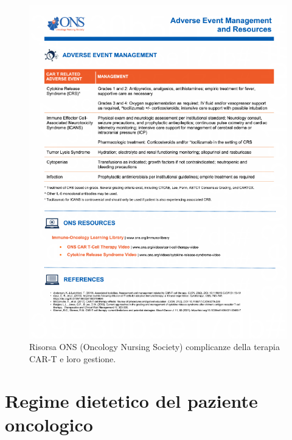 \begin{figure}[H]
    \begin{center}
    \vspace{-3mm}
    \includegraphics[width=0.9\columnwidth]{img/ONS.png}
    \end{center}
    \caption{Risorsa ONS (Oncology Nursing Society) complicanze della terapia CAR-T e loro gestione.
    \cite{ONSCART}}
    \label{fig:FIGURE_5.7}
\end{figure}

\section{Regime dietetico del paziente oncologico}

